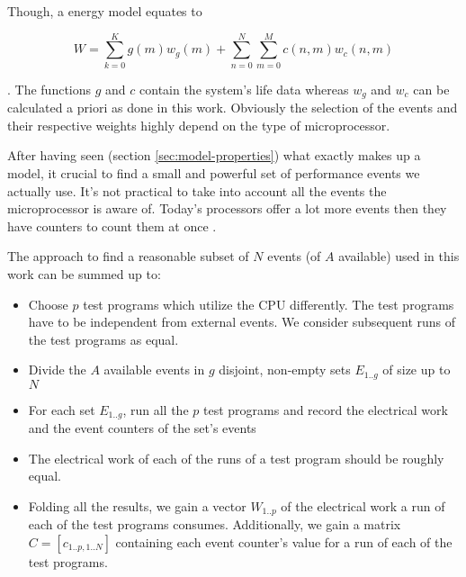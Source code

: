 Though, a energy model equates to

\begin{equation}
W = \sum\limits_{k=0}^K g(m) w_g(m) +
\sum\limits_{n=0}^N \sum\limits_{m=0}^M c(n, m) w_c(n,m)
\end{equation}

. The functions $g$ and $c$ contain the system's life data whereas $w_g$ and
$w_c$ can be calculated a priori as done in this work. Obviously the selection
of the events and their respective weights highly depend on the type of
microprocessor.


\label{sec:min-events}

After having seen (section \ref{sec:model-properties}) what exactly makes up a
model, it crucial to find a small and powerful set of performance events we
actually use. It's not practical to take into account all the events the
microprocessor is aware of. Today's processors offer a lot more events then they
have counters to count them at once \cite{intel2011softdev}.

The approach to find a reasonable subset of $N$ events (of $A$ available) used
in this work can be summed up to:

\begin{itemize}

\item Choose $p$ test programs which utilize the CPU differently. The test
programs have to be independent from external events. We consider subsequent
runs of the test programs as equal.

\item Divide the $A$ available events in $g$ disjoint, non-empty sets $E_{1..g}$
of size up to $N$

\item For each set $E_{1..g}$, run all the $p$ test programs and record the
electrical work and the event counters of the set's events

\item The electrical work of each of the runs of a test program should be
roughly equal.

\item Folding all the results, we gain a vector $W_{1..p}$ of the electrical
work a run of each of the test programs consumes. Additionally, we gain a matrix
$C = [c_{1..p,1..N}]$ containing each event counter's value for a run of each of
the test programs.

\end{itemize}


